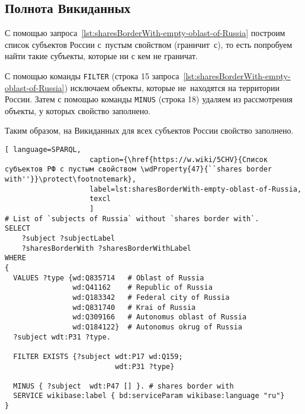 \newpage
\subsection{Полнота Викиданных}

С помощью запроса~\ref{lst:sharesBorderWith-empty-oblast-of-Russia} 
построим список субъектов России 
с~пустым свойством  (граничит~с), 
то есть попробуем найти такие субъекты, которые ни с кем не граничат.



С помощью команды \lstinline|FILTER| (строка 15 запроса~\ref{lst:sharesBorderWith-empty-oblast-of-Russia}) 
исключаем объекты, которые не~находятся на территории России. 
Затем с помощью команды \lstinline|MINUS| (строка 18) удаляем из рассмотрения объекты, 
у которых свойство  заполнено.

Таким образом, на Викиданных для всех субъектов России свойство  заполнено.

\lstset{numbers=left, firstnumber=1, frame=single}
\begin{lstlisting}[ language=SPARQL, 
                    caption={\href{https://w.wiki/5CHV}{Список субъектов РФ с пустым свойством \wdProperty{47}{``shares border with''}}\protect\footnotemark},
                    label=lst:sharesBorderWith-empty-oblast-of-Russia,
                    texcl 
                    ]
# List of `subjects of Russia` without `shares border with`. 
SELECT 
    ?subject ?subjectLabel 
    ?sharesBorderWith ?sharesBorderWithLabel
WHERE
{
  VALUES ?type {wd:Q835714   # Oblast of Russia
                wd:Q41162    # Republic of Russia
                wd:Q183342   # Federal city of Russia
                wd:Q831740   # Krai of Russia
                wd:Q309166   # Autonomus oblast of Russia
                wd:Q184122}  # Autonomus okrug of Russia
  ?subject wdt:P31 ?type.
  
  FILTER EXISTS {?subject wdt:P17 wd:Q159; 
                          wdt:P31 ?type}
  
  MINUS { ?subject  wdt:P47 [] }. # shares border with 
  SERVICE wikibase:label { bd:serviceParam wikibase:language "ru"}
}
\end{lstlisting}%



